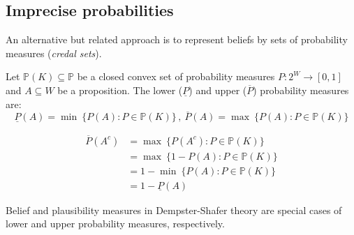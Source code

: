 \subsection{Imprecise probabilities}

An alternative but related approach is to represent beliefs by sets of
probability measures (\textit{credal sets}).

\begin{dfn}
  Let $\mathbb{P}(K) \subseteq \mathbb{P}$ be a closed convex set of probability
  measures $P : 2^W \to [0, 1]$ and $A \subseteq W$ be a proposition.
  The lower ($\underline{P}$) and upper ($\overline{P}$) probability measures are:
  \begin{equation}
    \underline{P}(A) = \min\ \{ P(A) : P \in \mathbb{P}(K) \}\,,\
    \overline{P}(A)  = \max\ \{ P(A) : P \in \mathbb{P}(K) \}
  \end{equation}
\end{dfn}

\begin{thm}
  \begin{align}
    \overline{P}(A^{c})
     & = \max\ \{ P(A^c) : P \in \mathbb{P}(K) \} \nonumber
    \\
     & = \max\ \{ 1 - P(A) : P \in \mathbb{P}(K) \} \nonumber
    \\
     & = 1 - \min\ \{ P(A) : P \in \mathbb{P}(K) \} \nonumber
    \\
     & = 1 - \underline{P}(A)
  \end{align}
\end{thm}

Belief and plausibility measures in Dempster-Shafer theory are special cases of
lower and upper probability measures, respectively.

